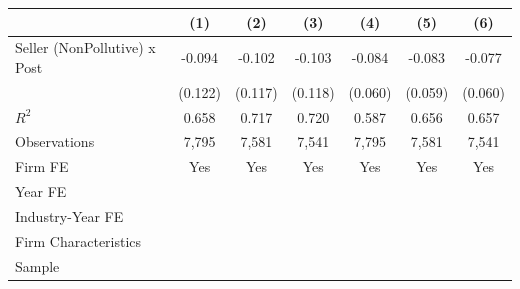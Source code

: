 {
\def\sym#1{\ifmmode^{#1}\else\(^{#1}\)\fi}
\begin{tabular}{l*{6}{c}}
\toprule
                    &\multicolumn{1}{c}{(1)}   &\multicolumn{1}{c}{(2)}   &\multicolumn{1}{c}{(3)}   &\multicolumn{1}{c}{(4)}   &\multicolumn{1}{c}{(5)}   &\multicolumn{1}{c}{(6)}   \\
\midrule
Seller (NonPollutive) x Post&      -0.094   &      -0.102   &      -0.103   &      -0.084   &      -0.083   &      -0.077   \\
                    &     (0.122)   &     (0.117)   &     (0.118)   &     (0.060)   &     (0.059)   &     (0.060)   \\
\midrule
\(R^{2}\)           &       0.658   &       0.717   &       0.720   &       0.587   &       0.656   &       0.657   \\
Observations        &       7,795   &       7,581   &       7,541   &       7,795   &       7,581   &       7,541   \\
Firm FE             &         Yes   &         Yes   &         Yes   &         Yes   &         Yes   &         Yes   \\
Year FE             &               &               &               &               &               &               \\
Industry-Year FE    &               &               &               &               &               &               \\
Firm Characteristics&               &               &               &               &               &               \\
Sample              &               &               &               &               &               &               \\
\bottomrule
\end{tabular}
}
